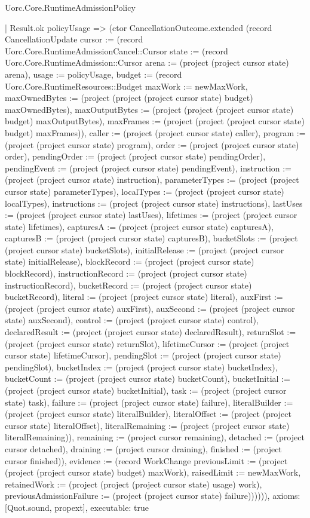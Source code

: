 \begin{lexlean}{Uorc.Core.RuntimeAdmissionPolicy}
\begin{semanticmodule}
{    | Result.ok policyUsage => (ctor CancellationOutcome.extended (record CancellationUpdate {cursor := (record Uorc.Core.RuntimeAdmissionCancel::Cursor {state := (record Uorc.Core.RuntimeAdmission::Cursor {arena := (project (project cursor state) arena), usage := policyUsage, budget := (record Uorc.Core.RuntimeResources::Budget {maxWork := newMaxWork, maxOwnedBytes := (project (project (project cursor state) budget) maxOwnedBytes), maxOutputBytes := (project (project (project cursor state) budget) maxOutputBytes), maxFrames := (project (project (project cursor state) budget) maxFrames)}), caller := (project (project cursor state) caller), program := (project (project cursor state) program), order := (project (project cursor state) order), pendingOrder := (project (project cursor state) pendingOrder), pendingEvent := (project (project cursor state) pendingEvent), instruction := (project (project cursor state) instruction), parameterTypes := (project (project cursor state) parameterTypes), localTypes := (project (project cursor state) localTypes), instructions := (project (project cursor state) instructions), lastUses := (project (project cursor state) lastUses), lifetimes := (project (project cursor state) lifetimes), capturesA := (project (project cursor state) capturesA), capturesB := (project (project cursor state) capturesB), bucketSlots := (project (project cursor state) bucketSlots), initialRelease := (project (project cursor state) initialRelease), blockRecord := (project (project cursor state) blockRecord), instructionRecord := (project (project cursor state) instructionRecord), bucketRecord := (project (project cursor state) bucketRecord), literal := (project (project cursor state) literal), auxFirst := (project (project cursor state) auxFirst), auxSecond := (project (project cursor state) auxSecond), control := (project (project cursor state) control), declaredResult := (project (project cursor state) declaredResult), returnSlot := (project (project cursor state) returnSlot), lifetimeCursor := (project (project cursor state) lifetimeCursor), pendingSlot := (project (project cursor state) pendingSlot), bucketIndex := (project (project cursor state) bucketIndex), bucketCount := (project (project cursor state) bucketCount), bucketInitial := (project (project cursor state) bucketInitial), task := (project (project cursor state) task), failure := (project (project cursor state) failure), literalBuilder := (project (project cursor state) literalBuilder), literalOffset := (project (project cursor state) literalOffset), literalRemaining := (project (project cursor state) literalRemaining)}), remaining := (project cursor remaining), detached := (project cursor detached), draining := (project cursor draining), finished := (project cursor finished)}), evidence := (record WorkChange {previousLimit := (project (project (project cursor state) budget) maxWork), raisedLimit := newMaxWork, retainedWork := (project (project (project cursor state) usage) work), previousAdmissionFailure := (project (project cursor state) failure)})})))),
  axioms: [Quot.sound, propext],
  executable: true
}


\end{semanticmodule}
\end{lexlean}
